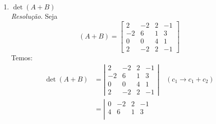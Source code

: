 \begin{enumerate}
\begin{align*}
\begin{array}{cccc}
                -3 & -6 & 0 & -3 \\
                -1 & 6 & 6 & 5 \\
                0 & 0 & 3 & 0 \\ 
                -2 & -8 & 0 & -8
            \end{array} 
        \right|
    \end{align*}
    Fixando a linha 3, temos:
    \begin{align*}
        \det (A \cdot B) & = 2 \cdot a_{33} \cdot C_{33} \\ & = 2 \cdot 3 \cdot (-1)^{6} \cdot \det \left|\begin{array}{ccc}
            -3 & -6 & -3 \\
            -1 & 6 & 5 \\
            -2 & -8 & -8
        \end{array}\right| \\ & =
        6 \cdot 72 \\ & =
        432
    \end{align*}
    Temos, portanto, que $\det (A \cdot B) = 432$.
    \item $\det (A + B)$ \\
    \emph{Resolução}. Seja 
    \begin{displaymath}
        (A + B) = \left[
            \begin{array}{cccc}
                2 & -2 & 2 & -1 \\
                -2 & 6 & 1 & 3 \\
                0 & 0 & 4 & 1 \\
                2 & -2 & 2 & -1
            \end{array}
        \right]
    \end{displaymath}
    Temos:
    \begin{align*}
        \det (A + B) &= \left|
            \begin{array}{cccc}
                2 & -2 & 2 & -1 \\
                -2 & 6 & 1 & 3 \\
                0 & 0 & 4 & 1 \\
                2 & -2 & 2 & -1
            \end{array}
        \right| \quad (c_1 \rightarrow c_1 + c_2) \\ &=
        \left|
            \begin{array}{cccc}
                0 & -2 & 2 & -1 \\
                4 & 6 & 1 & 3 \\

\end{array}
\end{align*}
\end{enumerate}
